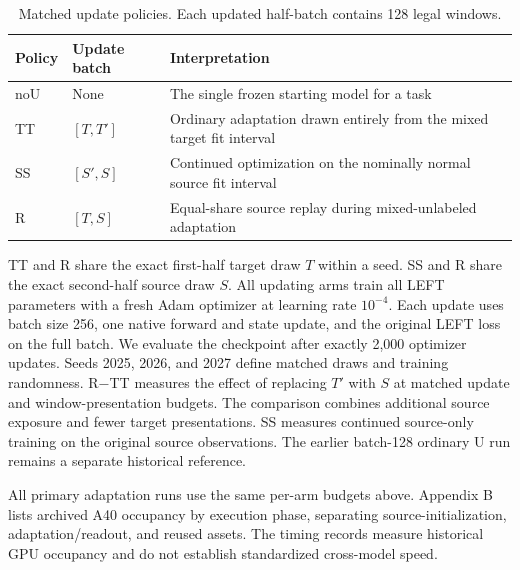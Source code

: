 \documentclass[pdflatex,sn-apa]{sn-jnl}
\begin{document}
\begin{longtable}[]{@{}
  >{\raggedright\arraybackslash}p{}
  >{\raggedright\arraybackslash}p{}
  >{\raggedright\arraybackslash}p{}@{}}
\caption{Matched update policies. Each updated half-batch contains 128 legal windows.}\tabularnewline
\toprule\noalign{}
\begin{minipage}[b]{\linewidth}\raggedright
Policy
\end{minipage} & \begin{minipage}[b]{\linewidth}\raggedright
Update batch
\end{minipage} & \begin{minipage}[b]{\linewidth}\raggedright
Interpretation
\end{minipage} \\
\midrule\noalign{}
\endhead
\bottomrule\noalign{}
\endlastfoot
noU & None & The single frozen starting model for a task \\
TT & \([T,T']\) & Ordinary adaptation drawn entirely from the mixed
target fit interval \\
SS & \([S',S]\) & Continued optimization on the nominally normal source
fit interval \\
R & \([T,S]\) & Equal-share source replay during mixed-unlabeled
adaptation \\
\end{longtable}

TT and R share the exact first-half target draw \(T\) within a seed. SS
and R share the exact second-half source draw \(S\). All updating arms
train all LEFT parameters with a fresh Adam optimizer at learning rate
\(10^{-4}\). Each update uses batch size 256, one native forward and
state update, and the original LEFT loss on the full batch. We evaluate
the checkpoint after exactly 2,000 optimizer updates. Seeds 2025, 2026,
and 2027 define matched draws and training randomness. R\ensuremath{-}TT measures the
effect of replacing \(T'\) with \(S\) at matched update and
window-presentation budgets. The comparison combines additional source
exposure and fewer target presentations. SS measures continued
source-only training on the original source observations. The earlier
batch-128 ordinary U run remains a separate historical reference.

All primary adaptation runs use the same per-arm budgets above. Appendix
B lists archived A40 occupancy by execution phase, separating
source-initialization, adaptation/readout, and reused assets. The timing
records measure historical GPU occupancy and do not establish
standardized cross-model speed.
\end{document}
